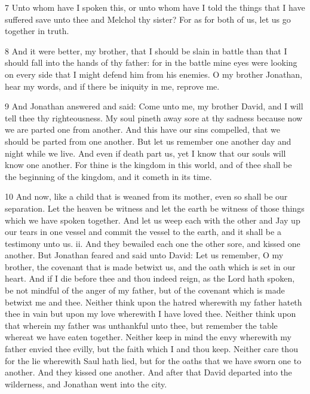 \par 7 Unto whom have I spoken this, or unto whom have I told the things that I have suffered save unto thee and Melchol thy sister? For as for both of us, let us go together in truth. 

\par 8 And it were better, my brother, that I should be slain in battle than that I should fall into the hands of thy father: for in the battle mine eyes were looking on every side that I might defend him from his enemies. O my brother Jonathan, hear my words, and if there be iniquity in me, reprove me.

\par 9 And Jonathan answered and said: Come unto me, my brother David, and I will tell thee thy righteousness. My soul pineth away sore at thy sadness because now we are parted one from another. And this have our sins compelled, that we should be parted from one another. But let us remember one another day and night while we live. And even if death part us, yet I know that our souls will know one another. For thine is the kingdom in this world, and of thee shall be the beginning of the kingdom, and it cometh in its time. 

\par 10 And now, like a child that is weaned from its mother, even so shall be our separation. Let the heaven be witness and let the earth be witness of those things which we have spoken together. And let us weep each with the other and Jay up our tears in one vessel and commit the vessel to the earth, and it shall be a testimony unto us. ii. And they bewailed each one the other sore, and kissed one another. But Jonathan feared and said unto David: Let us remember, O my brother, the covenant that is made betwixt us, and the oath which is set in our heart. And if I die before thee and thou indeed reign, as the Lord hath spoken, be not mindful of the anger of my father, but of the covenant which is made betwixt me and thee. Neither think upon the hatred wherewith my father hateth thee in vain but upon my love wherewith I have loved thee. Neither think upon that wherein my father was unthankful unto thee, but remember the table whereat we have eaten together. Neither keep in mind the envy wherewith my father envied thee evilly, but the faith which I and thou keep. Neither care thou for the lie wherewith Saul hath lied, but for the oaths that we have sworn one to another. And they kissed one another. And after that David departed into the wilderness, and Jonathan went into the city.

